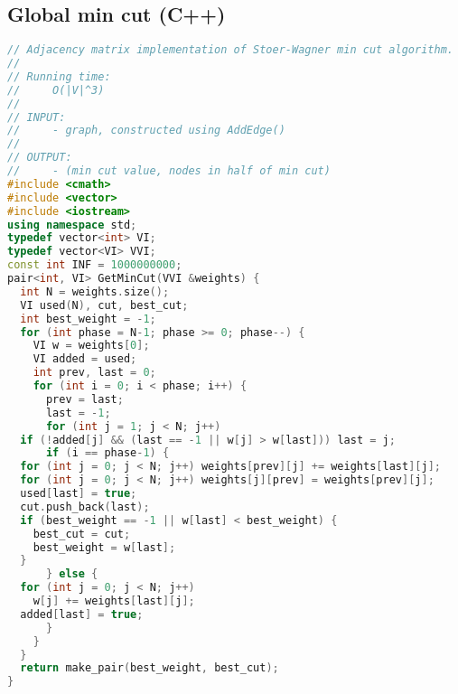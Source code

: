 \subsection{Global min cut (C++)}
\begin{lstlisting}[language=C++]
// Adjacency matrix implementation of Stoer-Wagner min cut algorithm.
//
// Running time:
//     O(|V|^3)
//
// INPUT: 
//     - graph, constructed using AddEdge()
//
// OUTPUT:
//     - (min cut value, nodes in half of min cut)
#include <cmath>
#include <vector>
#include <iostream>
using namespace std;
typedef vector<int> VI;
typedef vector<VI> VVI;
const int INF = 1000000000;
pair<int, VI> GetMinCut(VVI &weights) {
  int N = weights.size();
  VI used(N), cut, best_cut;
  int best_weight = -1;
  for (int phase = N-1; phase >= 0; phase--) {
    VI w = weights[0];
    VI added = used;
    int prev, last = 0;
    for (int i = 0; i < phase; i++) {
      prev = last;
      last = -1;
      for (int j = 1; j < N; j++)
  if (!added[j] && (last == -1 || w[j] > w[last])) last = j;
      if (i == phase-1) {
  for (int j = 0; j < N; j++) weights[prev][j] += weights[last][j];
  for (int j = 0; j < N; j++) weights[j][prev] = weights[prev][j];
  used[last] = true;
  cut.push_back(last);
  if (best_weight == -1 || w[last] < best_weight) {
    best_cut = cut;
    best_weight = w[last];
  }
      } else {
  for (int j = 0; j < N; j++)
    w[j] += weights[last][j];
  added[last] = true;
      }
    }
  }
  return make_pair(best_weight, best_cut);
}
\end{lstlisting}
